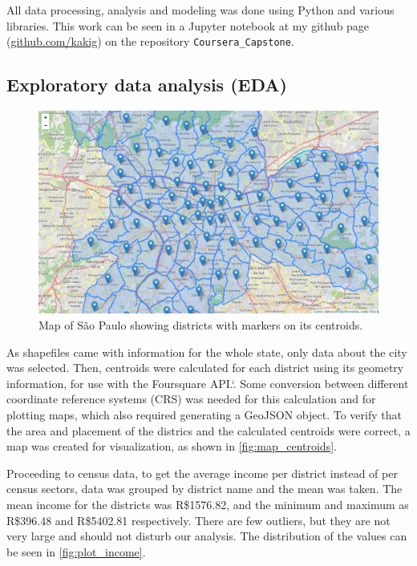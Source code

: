 \documentclass[12pt]{article}
\begin{document}
All data processing, analysis and modeling was done using Python and various
libraries. This work can be seen in a Jupyter notebook at my github page
(\href{https://github.com/kakig}{github.com/kakig}) on the repository
\verb!Coursera_Capstone!.

\vfill

\subsection{Exploratory data analysis (EDA)}

\begin{figure}
        \centering
        \includegraphics[width=\linewidth]{map_centroids.png}
        \caption{Map of São Paulo showing districts with markers on its
        centroids.\label{fig:map_centroids}}
\end{figure}

As shapefiles came with information for the whole state, only data about the
city was selected. Then, centroids were calculated for each district using its
geometry information, for use with the Foursquare API.\spacefactor\sfcode`.{}
Some conversion between different coordinate reference systems (CRS) was needed
for this calculation and for plotting maps, which also required generating a
GeoJSON object. To verify that the area and placement of the districs and the
calculated centroids were correct, a map was created for visualization, as
shown in \autoref{fig:map_centroids}.


Proceeding to census data, to get the average income per district instead of
per census sectors, data was grouped by district name and the mean was taken.
The mean income for the districts was R\$1576.82, and the minimum and maximum
as R\$396.48 and R\$5402.81 respectively. There are few outliers, but they are
not very large and should not disturb our analysis. The distribution of the
values can be seen in \autoref{fig:plot_income}.
\end{document}

